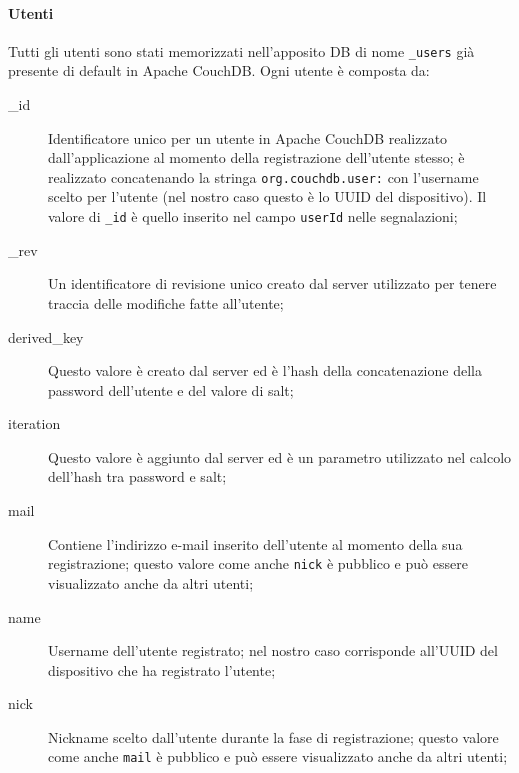                 \paragraph{Utenti}
                Tutti gli utenti sono stati memorizzati nell'apposito DB di 
                nome \texttt{\_users} già presente di default in Apache 
                CouchDB\texttrademark{}. Ogni utente è composta da:
                \begin{description}
                    \item[\_id] Identificatore unico per un utente in Apache 
                    CouchDB\texttrademark{} realizzato dall'applicazione al 
                    momento della registrazione dell'utente stesso; è 
                    realizzato concatenando la stringa 
                    \texttt{org.couchdb.user:} con l'username scelto per 
                    l'utente (nel nostro caso questo è lo UUID del dispositivo).
                    Il valore di \texttt{\_id} è quello inserito nel campo 
                    \texttt{userId} nelle segnalazioni;
                    \item[\_rev] Un identificatore di revisione unico creato 
                    dal server utilizzato per tenere traccia delle modifiche 
                    fatte all'utente;
                    \item[derived\_key] Questo valore è creato dal server ed 
                    è l'hash della concatenazione della password dell'utente e 
                    del valore di salt;
                    \item[iteration] Questo valore è aggiunto dal server ed è 
                    un parametro utilizzato nel calcolo dell'hash tra password 
                    e salt;
                    \item[mail] Contiene l'indirizzo e-mail inserito 
                    dell'utente al momento della sua registrazione; questo 
                    valore come anche \texttt{nick} è pubblico e può essere 
                    visualizzato anche da altri utenti;
                    \item[name] Username dell'utente registrato; nel nostro 
                    caso corrisponde all'UUID del dispositivo che ha 
                    registrato l'utente;
                    \item[nick] Nickname scelto dall'utente durante la fase di 
                    registrazione; questo valore come anche \texttt{mail} è 
                    pubblico e può essere visualizzato anche da altri utenti;

\end{description}
